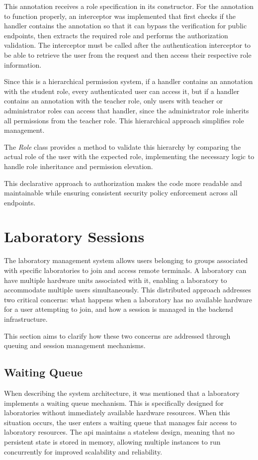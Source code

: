 This annotation receives a role specification in its constructor. For the annotation to function properly, an interceptor was implemented that first checks if the handler contains the annotation so that it can bypass the verification for public endpoints, then extracts the required role and performs the authorization validation. The interceptor must be called after the authentication interceptor to be able to retrieve the user from the request and then access their respective role information.

Since this is a hierarchical permission system, if a handler contains an annotation with the student role, every authenticated user can access it, but if a handler contains an annotation with the teacher role, only users with teacher or administrator roles can access that handler, since the administrator role inherits all permissions from the teacher role. This hierarchical approach simplifies role management.

The \textit{Role} class provides a method to validate this hierarchy by comparing the actual role of the user with the expected role, implementing the necessary logic to handle role inheritance and permission elevation.

This declarative approach to authorization makes the code more readable and maintainable while ensuring consistent security policy enforcement across all endpoints.

\section{Laboratory Sessions}
The laboratory management system allows users belonging to groups associated with specific laboratories to join and access remote terminals. A laboratory can have multiple hardware units associated with it, enabling a laboratory to accommodate multiple users simultaneously. This distributed approach addresses two critical concerns: what happens when a laboratory has no available hardware for a user attempting to join, and how a session is managed in the backend infrastructure.

This section aims to clarify how these two concerns are addressed through queuing and session management mechanisms.

\subsection{Waiting Queue}
When describing the system architecture, it was mentioned that a laboratory implements a waiting queue mechanism. This is specifically designed for laboratories without immediately available hardware resources. When this situation occurs, the user enters a waiting queue that manages fair access to laboratory resources. The \acs{api} maintains a stateless design, meaning that no persistent state is stored in memory, allowing multiple instances to run concurrently for improved scalability and reliability.


